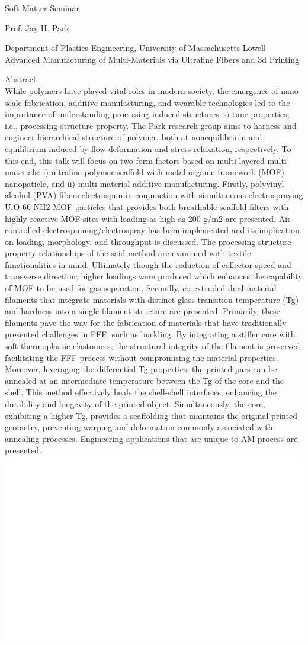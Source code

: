 \documentclass[portrait]{a0poster}
\newcommand{\hl}[1]{\textcolor{accent}{#1}} %
\newcommand\mybig{\fontsize{150pt}{45pt}\selectfont}
\newcommand\speaker{\fontsize{100pt}{18pt}\selectfont}
\begin{document}
{\mybig\hl{Soft Matter} Seminar}

{\speaker\hl{Prof. Jay H. Park}}

Department of Plastics Engineering, 
University of Massachusetts-Lowell
Advanced Manufacturing of Multi-Materials 
via Ultrafine Fibers and 3d Printing

\hl{Abstract}
\\ \large{While polymers have played vital roles in modern society, the emergence of nano-scale fabrication, additive manufacturing, and wearable technologies led to the importance of understanding processing-induced structures to tune properties, i.e., processing-structure-property. The Park research group aims to harness and engineer hierarchical structure of polymer, both at nonequilibrium and equilibrium induced by flow deformation and stress relaxation, respectively. To this end, this talk will focus on two form factors based on multi-layered multi-materials: i) ultrafine polymer scaffold with metal organic framework (MOF) nanopaticle, and ii) multi-material additive manufacturing. 
    Firstly, polyvinyl alcohol (PVA) fibers electrospun in conjunction with simultaneous electrospraying UiO-66-NH2 MOF particles that provides both breathable scaffold filters with highly reactive MOF sites with loading as high as 200 g/m2 are presented.  Air-controlled electrospinning/electrospray has been implemented and its implication on loading, morphology, and throughput is discussed. The processing-structure-property relationships of the said method are examined with textile functionalities in mind. Ultimately though the reduction of collector speed and transverse direction; higher loadings were produced which enhances the capability of MOF to be used for gas separation. 
    Secondly, co-extruded dual-material filaments that integrate materials with distinct glass transition temperature (Tg) and hardness into a single filament structure are presented. Primarily, these filaments pave the way for the fabrication of materials that have traditionally presented challenges in FFF, such as buckling. By integrating a stiffer core with soft thermoplastic elastomers, the structural integrity of the filament is preserved, facilitating the FFF process without compromising the material properties. Moreover, leveraging the differential Tg properties, the printed pars can be annealed at an intermediate temperature between the Tg of the core and the shell. This method effectively heals the shell-shell interfaces, enhancing the durability and longevity of the printed object. Simultaneously, the core, exhibiting a higher Tg, provides a scaffolding that maintains the original printed geometry, preventing warping and deformation commonly associated with annealing processes. Engineering applications that are unique to AM process are presented.}
\includegraphics{Phase_Transition.png}
\end{document}
